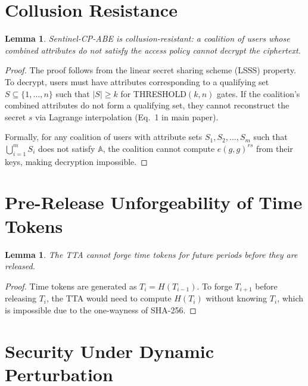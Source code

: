 \documentclass[lettersize,journal]{IEEEtran}
\newtheorem{lemma}[theorem]{Lemma}
\begin{document}
\section{Collusion Resistance}
\label{sec:collusion_resistance}

\begin{lemma}
\label{lem:collusion_resistance}
Sentinel-CP-ABE is collusion-resistant: a coalition of users whose combined attributes do not satisfy the access policy cannot decrypt the ciphertext.
\end{lemma}

\begin{proof}
The proof follows from the linear secret sharing scheme (LSSS) property. To decrypt, users must have attributes corresponding to a qualifying set $S \subseteq \{1, \ldots, n\}$ such that $|S| \geq k$ for THRESHOLD$(k,n)$ gates. If the coalition's combined attributes do not form a qualifying set, they cannot reconstruct the secret $s$ via Lagrange interpolation (Eq.~1 in main paper).

Formally, for any coalition of users with attribute sets $S_1, S_2, \ldots, S_m$ such that $\bigcup_{i=1}^m S_i$ does not satisfy $\mathbb{A}$, the coalition cannot compute $e(g,g)^{r s}$ from their keys, making decryption impossible.
\end{proof}

\section{Pre-Release Unforgeability of Time Tokens}
\label{sec:pre_release}

\begin{lemma}
\label{lem:pre_release}
The TTA cannot forge time tokens for future periods before they are released.
\end{lemma}

\begin{proof}
Time tokens are generated as $T_i = H(T_{i-1})$. To forge $T_{i+1}$ before releasing $T_i$, the TTA would need to compute $H(T_i)$ without knowing $T_i$, which is impossible due to the one-wayness of SHA-256.
\end{proof}

\section{Security Under Dynamic Perturbation}
\label{sec:dyn_perturbation}

\setcounter{table}{0}
\setcounter{equation}{0}
\end{document}
